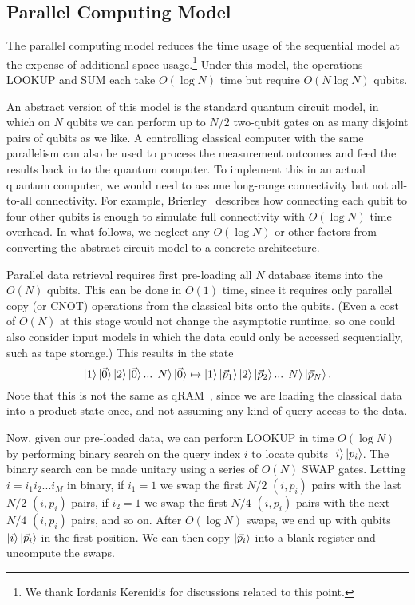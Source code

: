 \documentclass[aps,prd,twocolumn,superscriptaddress,preprintnumbers,nofootinbib,longbibliography,floatfix]{revtex4-1}
\begin{document}
\subsection{Parallel Computing Model}
\label{subsec:groverpar}

The parallel computing model reduces the time usage of the sequential model at the expense of additional space usage.\footnote{We thank Iordanis Kerenidis for discussions related to this point.}
%
Under this model, the operations LOOKUP and SUM each take $O(\log N)$ time but require
$O(N\log N)$ qubits.

An abstract version of this model is the standard quantum circuit model, in
which on $N$ qubits we can perform up to $N/2$ two-qubit gates on as many
disjoint pairs of qubits as we like.
%
A controlling classical computer with the same parallelism can also be used to
process the measurement outcomes and feed the results back in to the quantum
computer.
%
To implement this in an actual quantum computer, we would need to assume
long-range connectivity but not all-to-all connectivity.
%
For example, Brierley~\cite{2015arXiv150704263B} describes how connecting each
qubit to four other qubits is enough to simulate full connectivity with $O(\log
N)$ time overhead.
%
In what follows, we neglect any $O(\log N)$ or other factors from converting the
abstract circuit model to a concrete architecture.

Parallel data retrieval requires first pre-loading all $N$ database items into
the $O(N)$ qubits.
%
This can be done in $O(1)$ time, since it requires only parallel copy (or CNOT)
operations from the classical bits onto the qubits.
%
(Even a cost of $O(N)$ at this stage would not change the asymptotic runtime, so
one could also consider input models in which the data could only be accessed
sequentially, such as tape storage.)
%
This results in the state
%
\begin{equation}
\label{eq:parallel_storage}
\ket{1}\ket{\vec{0}}\ket{2}\ket{\vec{0}}...\ket{N}\ket{\vec{0}}\mapsto\ket{1}\ket{\vec{p}_1}\ket{2}\ket{\vec{p}_2}...\ket{N}\ket{\vec{p}_N}.
\end{equation}
%
Note that this is not the same as qRAM~\cite{PhysRevLett.100.160501}, since we
are loading the classical data into a product state once, and not assuming any
kind of query access to the data.  


Now, given our pre-loaded data, we can perform LOOKUP in time $O(\log N)$ by performing binary search on the query index $i$ to locate qubits $\ket{i}\ket{p_i}$.
%
The binary search can be made unitary using a series of $O(N)$ SWAP gates.
%
Letting $i=i_1i_{2}...i_M$ in binary, if $i_1=1$ we swap the first $N/2$ $(i, p_i)$ pairs with the last $N/2$ $(i, p_i)$ pairs, if $i_2=1$ we swap the first $N/4$ $(i, p_i)$ pairs with the next $N/4$ $(i, p_i)$ pairs, and so on.
%
After $O(\log N)$ swaps, we end up with qubits $\ket{i}\ket{\vec{p}_i}$ in the first position.
%
We can then copy $\ket{\vec{p}_i}$ into a blank register and uncompute the swaps.
\end{document}

